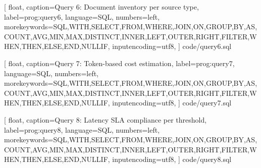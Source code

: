 
    [
        float,
        caption={Query 6: Document inventory per source type},
        label=prog:query6,
        language=SQL,
        numbers=left,
        morekeywords={SQL,WITH,SELECT,FROM,WHERE,JOIN,ON,GROUP,BY,AS,COUNT,AVG,MIN,MAX,DISTINCT,INNER,LEFT,OUTER,RIGHT,FILTER,WHEN,THEN,ELSE,END,NULLIF},
        inputencoding=utf8,
    ]
    {code/query6.sql}


    [
        float,
        caption={Query 7: Token-based cost estimation},
        label=prog:query7,
        language=SQL,
        numbers=left,
        morekeywords={SQL,WITH,SELECT,FROM,WHERE,JOIN,ON,GROUP,BY,AS,COUNT,AVG,MIN,MAX,DISTINCT,INNER,LEFT,OUTER,RIGHT,FILTER,WHEN,THEN,ELSE,END,NULLIF},
        inputencoding=utf8,
    ]
    {code/query7.sql}


    [
        float,
        caption={Query 8: Latency SLA compliance per threshold},
        label=prog:query8,
        language=SQL,
        numbers=left,
        morekeywords={SQL,WITH,SELECT,FROM,WHERE,JOIN,ON,GROUP,BY,AS,COUNT,AVG,MIN,MAX,DISTINCT,INNER,LEFT,OUTER,RIGHT,FILTER,WHEN,THEN,ELSE,END,NULLIF},
        inputencoding=utf8,
    ]
    {code/query8.sql}